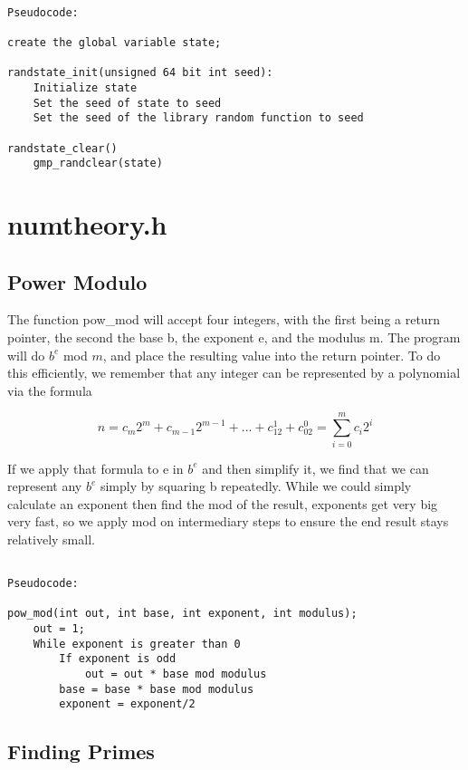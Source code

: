 \documentclass[11pt]{article}
\begin{document}
\begin{verbatim}

Pseudocode:

create the global variable state;

randstate_init(unsigned 64 bit int seed):
    Initialize state
    Set the seed of state to seed
    Set the seed of the library random function to seed

randstate_clear()
    gmp_randclear(state)

\end{verbatim}

\section{numtheory.h}

\subsection{Power Modulo}

The function pow\_mod will accept four integers, with the first being a return pointer, the second the base b, the exponent e, and the modulus m. The program will do $b^e$ mod $m$, and place the resulting value into the return pointer. To do this efficiently, we remember that any integer can be represented by a polynomial via the formula

\[n = c_m2^m + c_{m-1}2^{m-1} + ... + c_12^1 + c_02^0 = \sum_{i=0}^{m} c_i2^i\]

If we apply that formula to e in $b^e$ and then simplify it, we find that we can represent any $b^e$ simply by squaring b repeatedly. While we could simply calculate an exponent then find the mod of the result, exponents get very big very fast, so we apply mod on intermediary steps to ensure the end result stays relatively small.

\begin{verbatim}

Pseudocode:

pow_mod(int out, int base, int exponent, int modulus);
    out = 1;
    While exponent is greater than 0
        If exponent is odd
            out = out * base mod modulus
        base = base * base mod modulus
        exponent = exponent/2

\end{verbatim}

\subsection{Finding Primes}
\end{document}
